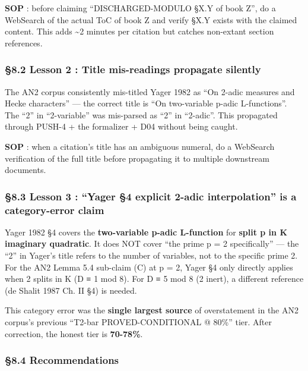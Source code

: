\documentclass[
  11pt,
  a4paper,
]{article}
\begin{document}
\textbf{SOP} : before claiming ``DISCHARGED-MODULO §X.Y of book Z'', do a WebSearch of the actual ToC of book Z and verify §X.Y exists with the claimed content. This adds \textasciitilde2 minutes per citation but catches non-extant section references.

\hypertarget{lesson-2-title-mis-readings-propagate-silently}{%
\subsubsection{§8.2 Lesson 2 : Title mis-readings propagate silently}\label{lesson-2-title-mis-readings-propagate-silently}}

The AN2 corpus consistently mis-titled Yager 1982 as ``On 2-adic measures and Hecke characters'' --- the correct title is ``On two-variable p-adic L-functions''. The ``2'' in ``2-variable'' was mis-parsed as ``2'' in ``2-adic''. This propagated through PUSH-4 + the formalizer + D04 without being caught.

\textbf{SOP} : when a citation's title has an ambiguous numeral, do a WebSearch verification of the full title before propagating it to multiple downstream documents.

\hypertarget{lesson-3-yager-4-explicit-2-adic-interpolation-is-a-category-error-claim}{%
\subsubsection{§8.3 Lesson 3 : ``Yager §4 explicit 2-adic interpolation'' is a category-error claim}\label{lesson-3-yager-4-explicit-2-adic-interpolation-is-a-category-error-claim}}

Yager 1982 §4 covers the \textbf{two-variable p-adic L-function} for \textbf{split p in K imaginary quadratic}. It does NOT cover ``the prime p = 2 specifically'' --- the ``2'' in Yager's title refers to the number of variables, not to the specific prime 2. For the AN2 Lemma 5.4 sub-claim (C) at p = 2, Yager §4 only directly applies when 2 splits in K (D ≡ 1 mod 8). For D ≡ 5 mod 8 (2 inert), a different reference (de Shalit 1987 Ch. II §4) is needed.

This category error was the \textbf{single largest source} of overstatement in the AN2 corpus's previous ``T2-bar PROVED-CONDITIONAL @ 80\%'' tier. After correction, the honest tier is \textbf{70-78\%}.

\hypertarget{recommendations}{%
\subsubsection{§8.4 Recommendations}\label{recommendations}}
\end{document}
